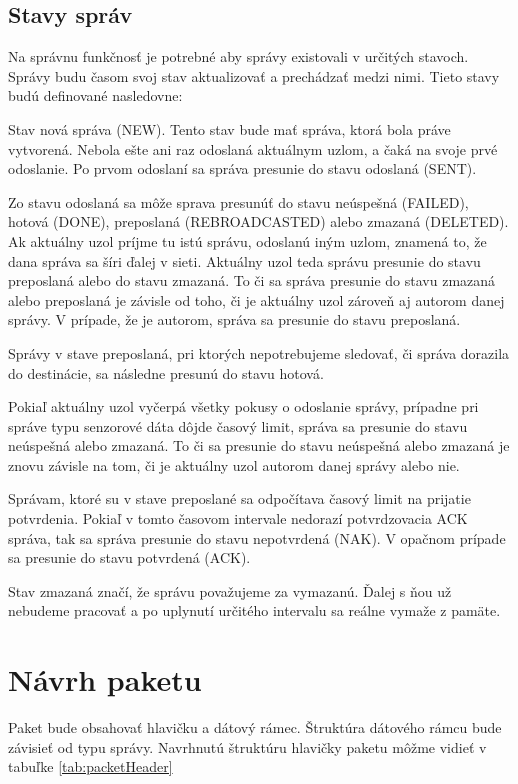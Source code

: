 \documentclass[slovak,master]{diploma}
\begin{document}
\subsection{Stavy správ}
Na správnu funkčnosť je potrebné aby správy existovali v určitých stavoch. Správy budu časom svoj stav aktualizovať a prechádzať medzi nimi. 
Tieto stavy budú definované nasledovne:

Stav nová správa (NEW). Tento stav bude mať správa, ktorá bola práve vytvorená. Nebola ešte ani raz odoslaná aktuálnym uzlom, a čaká na svoje 
prvé odoslanie. Po prvom odoslaní sa správa presunie do stavu odoslaná (SENT).

Zo stavu odoslaná sa môže sprava presunúť do stavu neúspešná (FAILED), hotová (DONE), preposlaná (REBROADCASTED) alebo zmazaná (DELETED). 
Ak aktuálny uzol príjme tu istú správu, odoslanú iným uzlom, znamená to, že dana správa sa šíri ďalej v sieti. Aktuálny uzol teda správu 
presunie do stavu preposlaná alebo do stavu zmazaná. 
To či sa správa presunie do stavu zmazaná alebo preposlaná je závisle od toho, či je aktuálny uzol zároveň aj autorom danej správy. V prípade, že je autorom, 
správa sa presunie do stavu preposlaná.

Správy v stave preposlaná, pri ktorých nepotrebujeme sledovať, či správa dorazila do destinácie, sa následne presunú do stavu hotová.

Pokiaľ aktuálny uzol vyčerpá všetky pokusy o odoslanie správy, prípadne pri správe typu senzorové dáta dôjde časový limit, správa sa presunie do stavu neúspešná alebo zmazaná.
To či sa presunie do stavu neúspešná alebo zmazaná je znovu závisle na tom, či je aktuálny uzol autorom danej správy alebo nie.

Správam, ktoré su v stave preposlané sa odpočítava časový limit na prijatie potvrdenia. Pokiaľ v tomto časovom intervale nedorazí potvrdzovacia ACK správa, tak sa 
správa presunie do stavu nepotvrdená (NAK). V opačnom prípade sa presunie do stavu potvrdená (ACK).

Stav zmazaná značí, že správu považujeme za vymazanú. Ďalej s ňou už nebudeme pracovať a po uplynutí určitého intervalu sa reálne vymaže z pamäte.

\section{Návrh paketu}
Paket bude obsahovať hlavičku a dátový rámec. Štruktúra dátového rámcu bude závisieť od typu správy.
Navrhnutú štruktúru hlavičky paketu môžme vidieť v tabuľke \ref{tab:packetHeader}
\end{document}
